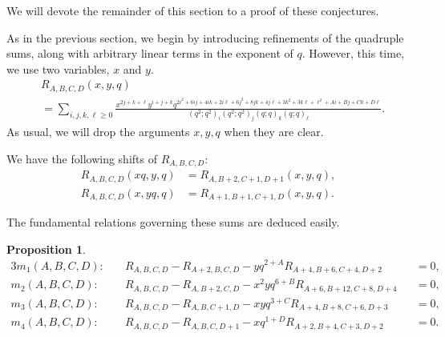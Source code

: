 \documentclass[10pt]{article}
\newtheorem{prop}[thm]{Proposition}
\begin{document}
We will devote the remainder of this section to a proof of these conjectures.

As in the previous section, we begin by introducing refinements of the quadruple sums, along with arbitrary linear terms in the exponent of $q$. However, this time, we use two variables, $x$ and $y$.
\begin{align}
\label{eqn:defR}
&R_{A,B,C,D}(x,y,q)\\
&= \sum_{i,j,k,\ell \ge 0}
\frac{x ^{2j + k + \ell } y ^{ i+j+k}q^{2i^2 + 6 ij + 4ik + 2i\ell + 6j^2 + 8 jk + 4 j\ell + 3k^2+3k\ell+\ell^2+Ai+Bj+Ck+D\ell}}
{\left(q^2;q^2\right)_i\left(q^2;q^2\right)_j\left(q;q\right)_k\left(q;q\right)_\ell}. \nonumber
\end{align}
As usual, we will drop the arguments $x,y,q$ when they are clear.

We have the following shifts of $R_{A,B,C,D}$:
\begin{align}
R_{A,B,C,D}(xq,y,q)&=R_{A,B+2,C+1,D+1}(x,y,q) \label{eqn:shiftRx},\\
R_{A,B,C,D}(x,yq,q)&=R_{A+1,B+1,C+1,D}(x,y,q) \label{eqn:shiftRy}.
\end{align}


The fundamental relations governing these sums are deduced easily.
\begin{prop}
\label{prop:mod10rels}
\begin{alignat}{3}
m_1(A,B,C,D):&\quad R_{A,B,C,D}-R_{A+2,B,C,D}-yq^{2+A}R_{A+4,B+6,C+4,D+2}&&=0 \label{eqn:relm1},\\
m_2(A,B,C,D):&\quad R_{A,B,C,D}-R_{A,B+2,C,D}-x^2yq^{6+B}R_{A+6,B+12,C+8,D+4}&&=0 \label{eqn:relm2},\\
m_3(A,B,C,D):&\quad R_{A,B,C,D}-R_{A,B,C+1,D}-xyq^{3+C}R_{A+4,B+8,C+6,D+3}&&=0 \label{eqn:relm3},\\
m_4(A,B,C,D):&\quad R_{A,B,C,D}-R_{A,B,C,D+1}-xq^{1+D}R_{A+2,B+4,C+3,D+2}&&=0 \label{eqn:relm4}.
\end{alignat}
\end{prop}
\end{document}
